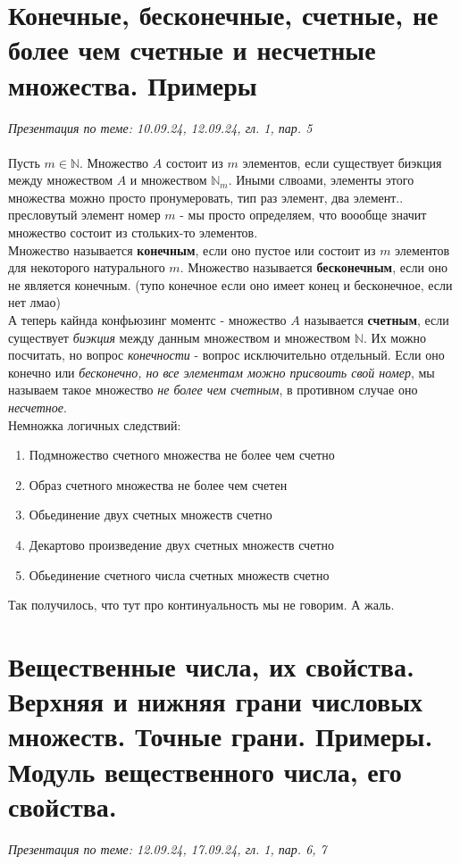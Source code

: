 \documentclass[10pt, a4paper,twocolumn]{article}
\begin{document}
\section{Конечные, бесконечные, счетные, не более чем счетные и несчетные множества. Примеры}
\textsl{Презентация по теме: 10.09.24, 12.09.24, гл. 1, пар. 5}
\\ \\Пусть $m \in \mathbb{N}$. Множество $A$ состоит из $m$ элементов, если существует биэкция между множеством $A$ и множеством $\mathbb{N}_{m}$. Иными слвоами, элементы этого множества можно просто пронумеровать, тип раз элемент, два элемент.. пресловутый элемент номер $m$ - мы просто определяем, что воообще значит множество состоит из стольких-то элементов.
\\Множество называется \textbf{конечным}, если оно пустое или состоит из $m$ элементов для некоторого натурального $m$. Множество называется \textbf{бесконечным}, если оно не является конечным. (тупо конечное если оно имеет конец и бесконечное, если нет лмао) 
\\А теперь кайнда конфьюзинг моментс - множество $A$ называется \textbf{счетным}, если существует \textsl{биэкция} между данным множеством и множеством $\mathbb{N}$. Их можно посчитать, но вопрос \textsl{конечности} - вопрос исключительно отдельный. Если оно конечно или \textsl{бесконечно, но все элементам можно присвоить свой номер}, мы называем такое множество \textsl{не более чем счетным}, в противном случае оно \textsl{несчетное}. 
\\Немножка логичных следствий:
\begin{enumerate}
    \item Подмножество счетного множества не более чем счетно
    \item Образ счетного множества не более чем счетен
    \item Обьединение двух счетных множеств счетно
    \item Декартово произведение двух счетных множеств счетно
    \item Обьединение счетного числа счетных множеств счетно 
\end{enumerate}
Так получилось, что тут про континуальность мы не говорим. А жаль.

\section{Вещественные числа, их свойства. Верхняя и нижняя грани числовых множеств. Точные грани. Примеры. Модуль вещественного числа, его свойства.}
\textsl{Презентация по теме: 12.09.24, 17.09.24, гл. 1, пар. 6, 7}
\end{document}
